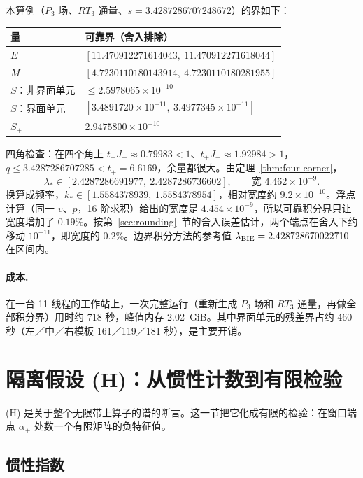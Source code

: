 \documentclass[11pt,a4paper,fontset=fandol]{ctexart}
\begin{document}
本算例（$P_3$ 场、$RT_3$ 通量、$s=3.4287286707248672$）的界如下：

\begin{center}
\small
\begin{tabular}{ll}
\toprule
量 & 可靠界（舍入排除） \\
\midrule
$E$ & $[11.470912271614043,\ 11.470912271618044]$ \\
$M$ & $[4.7230110180143914,\ 4.7230110180281955]$ \\
$S$：非界面单元 & $\le2.5978065\times10^{-10}$ \\
$S$：界面单元 & $[3.4891720\times10^{-11},\ 3.4977345\times10^{-11}]$ \\
$S_+$ & $2.9475800\times10^{-10}$ \\
\bottomrule
\end{tabular}
\end{center}

四角检查：在四个角上 $t_-J_+\approx0.79983<1$、$t_+J_+\approx1.92984>1$，$q\le3.4287286707285<t_+=6.6169$，余量都很大。由定理~\ref{thm:four-corner}，
\begin{equation}
\label{eq:main-interval}
\boxed{\lambda_*\in[2.4287286691977,\ 2.4287286736602],\qquad\text{宽 }4.462\times10^{-9}.}
\end{equation}
换算成频率，$k_*\in[1.5584378939,\ 1.5584378954]$，相对宽度约 $9.2\times10^{-10}$。浮点计算（同一 $v$、$p$，16 阶求积）给出的宽度是 $4.454\times10^{-9}$，所以可靠积分界只让宽度增加了 $0.19\%$。按第~\ref{sec:rounding}~节的舍入误差估计，两个端点在舍入下约移动 $10^{-11}$，即宽度的 $0.2\%$。边界积分方法的参考值 $\lambda_{\rm BIE}=2.428728670022710$ 在区间内。

\paragraph{成本.} 在一台 11 线程的工作站上，一次完整运行（重新生成 $P_3$ 场和 $RT_3$ 通量，再做全部积分界）用时约 718 秒，峰值内存 2.02~GiB。其中界面单元的残差界占约 460 秒（左／中／右模板 161／119／181 秒），是主要开销。

\section{隔离假设 (H)：从惯性计数到有限检验}
\label{sec:H}
(H) 是关于整个无限带上算子的谱的断言。这一节把它化成有限的检验：在窗口端点 $\alpha_+$ 处数一个有限矩阵的负特征值。

\subsection{惯性指数}
\end{document}
